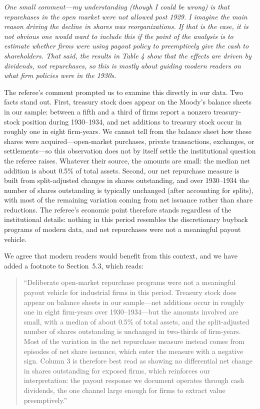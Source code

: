 \noindent \textit{\textcolor{red!60!black}{
One small comment---my understanding (though I could be wrong) is that repurchases in the open market were not allowed post 1929. I imagine the main reason driving the decline in shares was reorganizations. If that is the case, it is not obvious one would want to include this if the point of the analysis is to estimate whether firms were using payout policy to preemptively give the cash to shareholders. That said, the results in Table 4 show that the effects are driven by dividends, not repurchases, so this is mostly about guiding modern readers on what firm policies were in the 1930s.
}}

\bigskip

\noindent The referee's comment prompted us to examine this directly in our data. Two facts stand out. First, treasury stock does appear on the Moody's balance sheets in our sample: between a fifth and a third of firms report a nonzero treasury-stock position during 1930--1934, and net additions to treasury stock occur in roughly one in eight firm-years. We cannot tell from the balance sheet how these shares were acquired---open-market purchases, private transactions, exchanges, or settlements---so this observation does not by itself settle the institutional question the referee raises. Whatever their source, the amounts are small: the median net addition is about 0.5\% of total assets. Second, our net repurchase measure is built from split-adjusted changes in shares outstanding, and over 1930--1934 the number of shares outstanding is typically unchanged (after accounting for splits), with most of the remaining variation coming from net issuance rather than share reductions. The referee's economic point therefore stands regardless of the institutional details: nothing in this period resembles the discretionary buyback programs of modern data, and net repurchases were not a meaningful payout vehicle.

\medskip
\noindent We agree that modern readers would benefit from this context, and we have added a footnote to Section~5.3, which reads:

\begin{quote}
``Deliberate open-market repurchase programs were not a meaningful payout vehicle for industrial firms in this period. Treasury stock does appear on balance sheets in our sample---net additions occur in roughly one in eight firm-years over 1930--1934---but the amounts involved are small, with a median of about 0.5\% of total assets, and the split-adjusted number of shares outstanding is unchanged in two-thirds of firm-years. Most of the variation in the net repurchase measure instead comes from episodes of net share issuance, which enter the measure with a negative sign. Column 3 is therefore best read as showing no differential net change in shares outstanding for exposed firms, which reinforces our interpretation: the payout response we document operates through cash dividends, the one channel large enough for firms to extract value preemptively.''
\end{quote}
